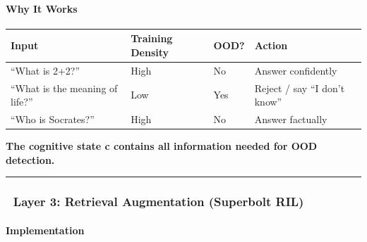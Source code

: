 \documentclass[
  11pt,
  a4paper,
]{article}
\begin{document}
\paragraph{Why It Works}\label{why-it-works-1}

\begin{longtable}[]{@{}
  >{\raggedright\arraybackslash}p{}
  >{\raggedright\arraybackslash}p{}
  >{\raggedright\arraybackslash}p{}
  >{\raggedright\arraybackslash}p{}@{}}
\toprule\noalign{}
\begin{minipage}[b]{\linewidth}\raggedright
Input
\end{minipage} & \begin{minipage}[b]{\linewidth}\raggedright
Training Density
\end{minipage} & \begin{minipage}[b]{\linewidth}\raggedright
OOD?
\end{minipage} & \begin{minipage}[b]{\linewidth}\raggedright
Action
\end{minipage} \\
\midrule\noalign{}
\endhead
\bottomrule\noalign{}
\endlastfoot
``What is 2+2?'' & High & No & Answer confidently \\
``What is the meaning of life?'' & Low & Yes & Reject / say ``I don't
know'' \\
``Who is Socrates?'' & High & No & Answer factually \\
\end{longtable}

\textbf{The cognitive state c contains all information needed for OOD
detection.}

\begin{center}\rule{0.5\linewidth}{0.5pt}\end{center}

\subsubsection{🧩 Layer 3: Retrieval Augmentation (Superbolt
RIL)}\label{layer-3-retrieval-augmentation-superbolt-ril}

\paragraph{Implementation}\label{implementation-3}
\end{document}
